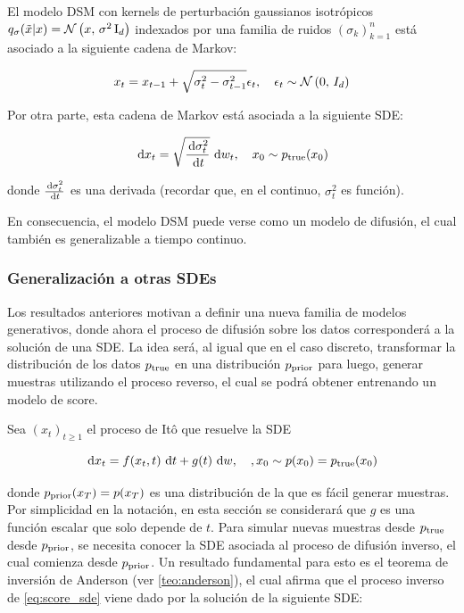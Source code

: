\begin{prop}
    El modelo DSM con kernels de perturbación gaussianos isotrópicos $q_{\sigma}(\tilde x|x)=\mathcal{N}\left(x,\,\sigma^2\operatorname{I}_{d}\right)$ indexados por una familia de ruidos $(\sigma_k)_{k=1}^n$ está asociado a la siguiente cadena de Markov:

    \begin{equation*}
        x_t = x_{t-1} + \sqrt{\sigma_t^2-\sigma^2_{t-1}} \epsilon_t,\quad \epsilon_t\sim\mathcal{N}\left(0,\,I_d\right)
    \end{equation*}

    Por otra parte, esta cadena de Markov está asociada a la siguiente SDE:

    \begin{equation}
        \label{eq:sdm_sde}
        \,\operatorname{d}\! x_t = \sqrt{\frac{\,\operatorname{d}\!\sigma_t^2}{\,\operatorname{d}\! t}}\,\operatorname{d}\! w_t, \quad x_0\sim p_{\operatorname{true}}(x_0)
    \end{equation}

    donde $\frac{\,\operatorname{d}\!\sigma_t^2}{\,\operatorname{d}\! t}$ es una derivada (recordar que, en el continuo, $\sigma_t^2$ es función).
\end{prop}

En consecuencia, el modelo DSM puede verse como un modelo de difusión, el cual también es generalizable a tiempo continuo.

\subsubsection{Generalización a otras SDEs}

Los resultados anteriores motivan a definir una nueva familia de modelos generativos, donde ahora el proceso de difusión sobre los datos corresponderá a la solución de una SDE. La idea será, al igual que en el caso discreto, transformar la distribución de los datos $p_{\operatorname{true}}$ en una distribución $p_{\operatorname{prior}}$ para luego, generar muestras utilizando el proceso reverso, el cual se podrá obtener entrenando un modelo de score.

Sea $(x_t)_{t\geq 1}$ el proceso de Itô que resuelve la SDE

\begin{equation}
    \label{eq:score_sde}
    \,\operatorname{d}\! x_t = f(x_t,t)\,\operatorname{d}\! t+g(t) \,\operatorname{d}\! w, \quad, x_0 \sim p(x_0)=p_{\operatorname{true}}(x_0)
\end{equation}

donde $p_{\operatorname{prior}}(x_T) = p(x_T)$ es una distribución de la que es fácil generar muestras. Por simplicidad en la notación, en esta sección se considerará que $g$ es una función escalar que solo depende de $t$. Para simular nuevas muestras desde $p_{\operatorname{true}}$ desde $p_{\operatorname{prior}}$, se necesita conocer la SDE asociada al proceso de difusión inverso, el cual comienza desde $p_{\operatorname{prior}}$. Un resultado fundamental para esto es el teorema de inversión de Anderson (ver \autoref{teo:anderson}), el cual afirma que el proceso inverso de \eqref{eq:score_sde} viene dado por la solución de la siguiente SDE:

